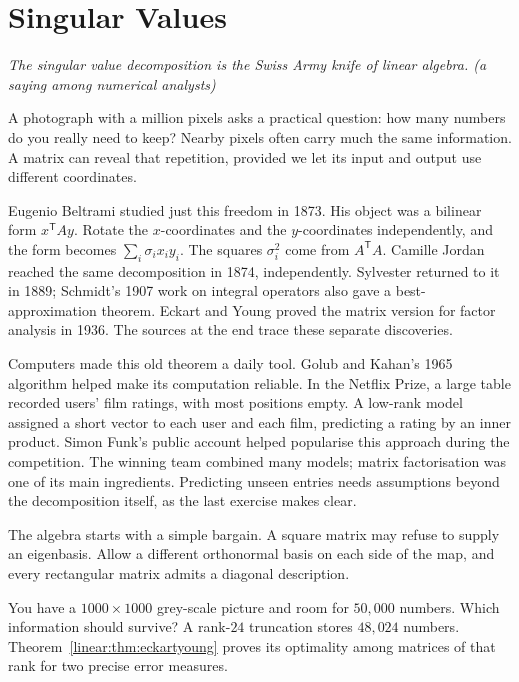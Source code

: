 \chapter{Singular Values}\label{linear:ch:svd}

\begin{center}\itshape
The singular value decomposition is the Swiss Army knife of linear algebra.
\upshape(a saying among numerical analysts)
\end{center}

A photograph with a million pixels asks a practical question: how many numbers do you really need to keep? Nearby pixels often carry much the same information. A matrix can reveal that repetition, provided we let its input and output use different coordinates.

Eugenio Beltrami studied just this freedom in 1873. His object was a bilinear form $x^{\mathsf T}Ay$. Rotate the $x$-coordinates and the $y$-coordinates independently, and the form becomes $\sum_i\sigma_ix_iy_i$. The squares $\sigma_i^2$ come from $A^{\mathsf T}A$. Camille Jordan reached the same decomposition in 1874, independently. Sylvester returned to it in 1889; Schmidt's 1907 work on integral operators also gave a best-approximation theorem. Eckart and Young proved the matrix version for factor analysis in 1936. The sources at the end trace these separate discoveries.


Computers made this old theorem a daily tool. Golub and Kahan's 1965 algorithm helped make its computation reliable. In the Netflix Prize, a large table recorded users' film ratings, with most positions empty. A low-rank model assigned a short vector to each user and each film, predicting a rating by an inner product. Simon Funk's public account helped popularise this approach during the competition. The winning team combined many models; matrix factorisation was one of its main ingredients. Predicting unseen entries needs assumptions beyond the decomposition itself, as the last exercise makes clear.

The algebra starts with a simple bargain. A square matrix may refuse to supply an eigenbasis. Allow a different orthonormal basis on each side of the map, and every rectangular matrix admits a diagonal description.

\begin{think}
You have a $1000\times1000$ grey-scale picture and room for $50{,}000$ numbers. Which information should survive? A rank-$24$ truncation stores $48{,}024$ numbers. Theorem~\ref{linear:thm:eckartyoung} proves its optimality among matrices of that rank for two precise error measures.
\end{think}

